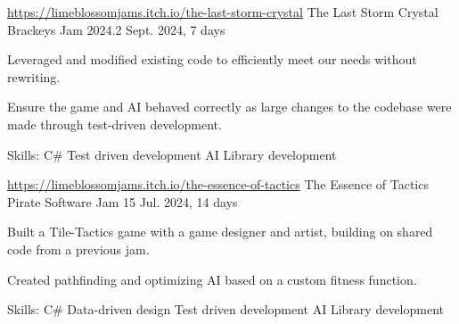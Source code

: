 

\begin{cventries}

 \cventry
  {\href{https://limeblossomjams.itch.io/the-last-storm-crystal}{https://limeblossomjams.itch.io/the-last-storm-crystal}} %
   {The Last Storm Crystal} %
   {Brackeys Jam 2024.2} %
   {Sept. 2024, 7 days} %
   {
     \begin{cvitems} %
      \item {Leveraged and modified existing code to efficiently meet our needs without rewriting.}
      \item {Ensure the game and AI behaved correctly as large changes to the codebase were made through test-driven development.}
      \item {Skills: C\# \textbullet{} Test driven development \textbullet{} AI \textbullet{} Library development }
     \end{cvitems}
   }
 
  \cventry
   {\href{https://limeblossomjams.itch.io/the-essence-of-tactics}{https://limeblossomjams.itch.io/the-essence-of-tactics}} %
    {The Essence of Tactics} %
    {Pirate Software Jam 15} %
    {Jul. 2024, 14 days} %
    {
      \begin{cvitems} %
        \item {Built a Tile-Tactics game with a game designer and artist, building on shared code from a previous jam.}
        \item {Created pathfinding and optimizing AI based on a custom fitness function.}
        \item {Skills: C\# \textbullet{} Data-driven design \textbullet{} Test driven development \textbullet{} AI \textbullet{} Library development }
      \end{cvitems}
    }


\end{cventries}
